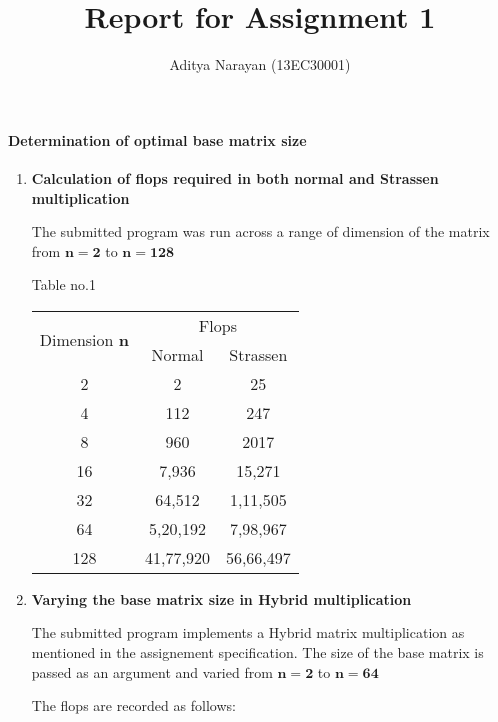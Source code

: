 \documentclass[a4paper,11pt]{article}
\title{Report for Assignment 1}
\author{Aditya Narayan (13EC30001)}
\begin{document}
\maketitle

\paragraph{Determination of optimal base matrix size}
\begin{enumerate}
 \item \textbf{Calculation of flops required in both normal and Strassen multiplication}

The submitted program was run across a range of dimension of the matrix from $\mathbf{n=2}$ to $\mathbf{n=128}$

\begin{center}
Table no.1
\begin{tabular}[pos]{|c|c|c|}
\hline
\multirow{2}{*}{Dimension $\mathbf{n}$} & \multicolumn{2}{|c|}{Flops} \\ \cline{2-3}
& Normal & Strassen\\ \hline
2 & 2 & 25 \\ \hline 
4 & 112 & 247 \\ \hline
8 & 960 & 2017 \\ \hline
16 & 7,936 & 15,271 \\ \hline
32 & 64,512 & 1,11,505 \\ \hline
64 & 5,20,192 & 7,98,967 \\ \hline
128 & 41,77,920 & 56,66,497 \\ \hline
\end{tabular}
\end{center}

 \item \textbf{Varying the base matrix size in Hybrid multiplication}

The submitted program implements a Hybrid matrix multiplication as mentioned in the assignement specification. The size of the base matrix is passed as an argument and varied from $\mathbf{n=2}$ to $\mathbf{n=64}$

The flops are recorded as follows:


\end{enumerate}
\end{document}
